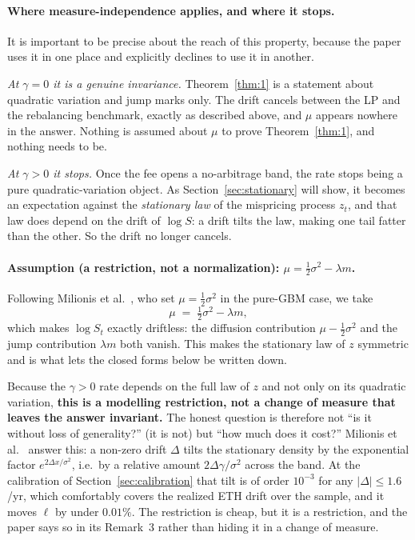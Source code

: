 \documentclass[11pt]{article}
\theoremstyle{definition}
\theoremstyle{remark}
\newcommand{\1}{\mathbf{1}}
\begin{document}
\paragraph{Where measure-independence applies, and where it stops.}
It is important to be precise about the reach of this property, because the paper uses it in one place and explicitly declines to use it in another.

\emph{At $\gamma = 0$ it is a genuine invariance.} Theorem~\ref{thm:1} is a statement about quadratic variation and jump marks only. The drift cancels between the LP and the rebalancing benchmark, exactly as described above, and $\mu$ appears nowhere in the answer. Nothing is assumed about $\mu$ to prove Theorem~\ref{thm:1}, and nothing needs to be.

\emph{At $\gamma > 0$ it stops.} Once the fee opens a no-arbitrage band, the rate stops being a pure quadratic-variation object. As Section~\ref{sec:stationary} will show, it becomes an expectation against the \emph{stationary law} of the mispricing process $z_t$, and that law does depend on the drift of $\log S$: a drift tilts the law, making one tail fatter than the other. So the drift no longer cancels.

\paragraph{Assumption (a restriction, not a normalization): $\mu = \tfrac12\sigma^2 - \lambda m$.}
Following Milionis et al.~\cite[Assumption~2]{milionis2023automated}, who set $\mu = \tfrac12\sigma^2$ in the pure-GBM case, we take
\[
\mu \;=\; \tfrac{1}{2}\sigma^2 - \lambda m ,
\]
which makes $\log S_t$ exactly driftless: the diffusion contribution $\mu - \tfrac12\sigma^2$ and the jump contribution $\lambda m$ both vanish. This makes the stationary law of $z$ symmetric and is what lets the closed forms below be written down.

Because the $\gamma>0$ rate depends on the full law of $z$ and not only on its quadratic variation, \textbf{this is a modelling restriction, not a change of measure that leaves the answer invariant.} The honest question is therefore not ``is it without loss of generality?'' (it is not) but ``how much does it cost?'' Milionis et al.~\cite[Thm.~8]{milionis2023automated} answer this: a non-zero drift $\Delta$ tilts the stationary density by the exponential factor $e^{2\Delta x/\sigma^2}$, i.e.\ by a relative amount $2\Delta\gamma/\sigma^2$ across the band. At the calibration of Section~\ref{sec:calibration} that tilt is of order $10^{-3}$ for any $|\Delta| \le 1.6$/yr, which comfortably covers the realized ETH drift over the sample, and it moves $\ell$ by under $0.01\%$. The restriction is cheap, but it is a restriction, and the paper says so in its Remark~3 rather than hiding it in a change of measure.
\end{document}
